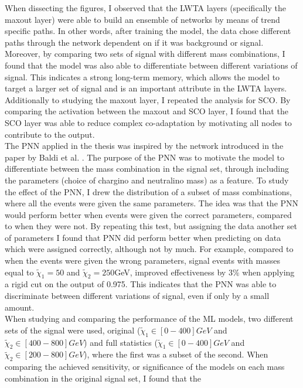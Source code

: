 When dissecting the figures, I observed that the \ac{LWTA} layers (specifically the maxout layer) were able to build an ensemble of networks by means of trend specific paths. In other words, after training 
the model, the data chose different paths through the network dependent on if it was background or signal. Moreover, by comparing two sets of signal with different mass combinations, I found that the model 
was also able to differentiate between different variations of signal. This indicates a strong long-term memory, which allows the model to target a larger set of signal and is an important attribute
in the \ac{LWTA} layers. Additionally to studying the maxout layer, I repeated the analysis for \ac{SCO}. By comparing the activation between the maxout and \ac{SCO} layer, I found that the \ac{SCO} layer 
was able to reduce complex co-adaptation by motivating all nodes to contribute to the output.
\\\newline
The \ac{PNN} applied in the thesis was inspired by the network introduced in the paper by Baldi et al. \cite{PNN}. The purpose of the \ac{PNN} was to motivate the model to differentiate between the mass combination 
in the signal set, through including the parameters (choice of chargino and neutralino mass) as a feature. To study the effect of the \ac{PNN}, I drew the distribution of a subset of mass combinations, where all the events were given the same parameters.
The idea was that the \ac{PNN} would perform better when events were given the correct parameters, compared to when they were not. By repeating this test, but assigning the data another set of parameters I found that \ac{PNN} did 
perform better when predicting on data which were assigned correctly, although not by much. For example, compared to when the events were given the wrong parameters, signal events with masses equal to $\tilde{\chi}_1=50$ 
and $\tilde{\chi}_2=250$GeV, improved effectiveness by $3\%$ when applying a rigid cut on the output of 0.975. This indicates that the \ac{PNN} was able to discriminate between different variations of signal, even if only by 
a small amount.
\\\newline
When studying and comparing the performance of the \ac{ML} models, two different sets of the signal were used, original ($\tilde{\chi}_1\in[0-400]GeV$ and  $\tilde{\chi}_2\in[400-800]GeV$) and full statistics ($\tilde{\chi}_1\in[0-400]GeV$ 
and  $\tilde{\chi}_2\in[200-800]GeV$), where the first was a subset of the second. When comparing the achieved sensitivity, or significance of the models on each mass combination in the original signal set, I found that the 
